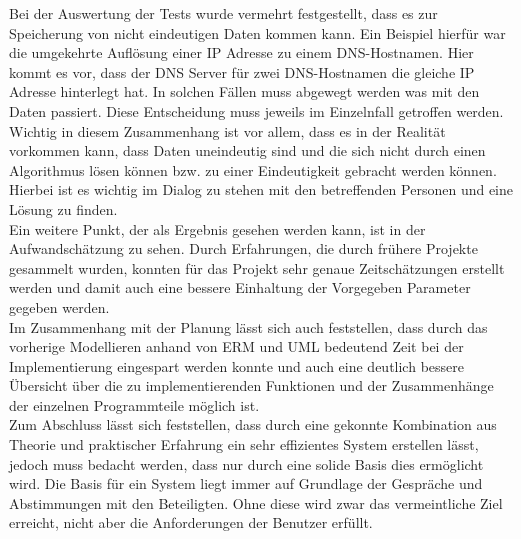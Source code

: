Bei der Auswertung der Tests wurde vermehrt festgestellt, dass es zur Speicherung von nicht eindeutigen Daten kommen kann. Ein Beispiel hierfür war die umgekehrte Auflösung einer IP Adresse zu einem DNS-Hostnamen. Hier kommt es vor, dass der DNS Server für zwei DNS-Hostnamen die gleiche IP Adresse hinterlegt hat. In solchen Fällen muss abgewegt werden was mit den Daten passiert. Diese Entscheidung muss jeweils im Einzelnfall getroffen werden. Wichtig in diesem Zusammenhang ist vor allem, dass es in der Realität vorkommen kann, dass Daten uneindeutig sind und die sich nicht durch einen Algorithmus lösen können bzw. zu einer Eindeutigkeit gebracht werden können. Hierbei ist es wichtig im Dialog zu stehen mit den betreffenden Personen und eine Lösung zu finden.\\
Ein weitere Punkt, der als Ergebnis gesehen werden kann, ist in der Aufwandschätzung zu sehen. Durch Erfahrungen, die durch frühere Projekte gesammelt wurden, konnten für das Projekt sehr genaue Zeitschätzungen erstellt werden und damit auch eine bessere Einhaltung der Vorgegeben Parameter gegeben werden.\\
Im Zusammenhang mit der Planung lässt sich auch feststellen, dass durch das vorherige Modellieren anhand von ERM und UML bedeutend Zeit bei der Implementierung eingespart werden konnte und auch eine deutlich bessere Übersicht über die zu implementierenden Funktionen und der Zusammenhänge der einzelnen Programmteile möglich ist.\\
Zum Abschluss lässt sich feststellen, dass durch eine gekonnte Kombination aus Theorie und praktischer Erfahrung ein sehr effizientes System erstellen lässt, jedoch muss bedacht werden, dass nur durch eine solide Basis dies ermöglicht wird. Die Basis für ein System liegt immer auf Grundlage der Gespräche und Abstimmungen mit den Beteiligten. Ohne diese wird zwar das vermeintliche Ziel erreicht, nicht aber die Anforderungen der Benutzer erfüllt.